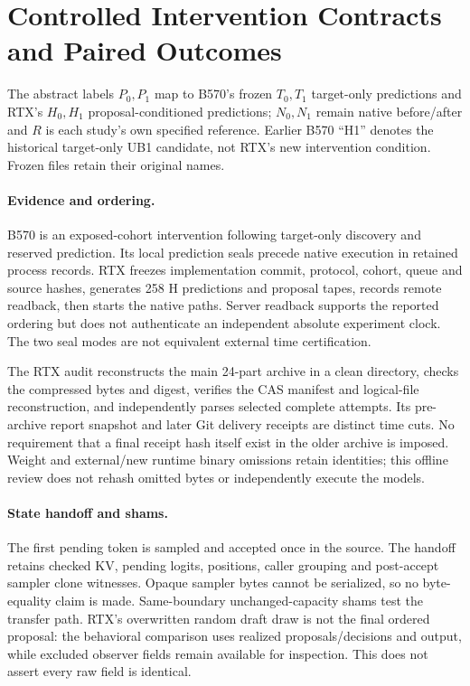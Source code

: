 \section{Controlled Intervention Contracts and Paired Outcomes}
\label{app:interventions}
The abstract labels $P_0,P_1$ map to B570's frozen $T_0,T_1$ target-only predictions and RTX's $H_0,H_1$ proposal-conditioned predictions; $N_0,N_1$ remain native before/after and $R$ is each study's own specified reference. Earlier B570 ``H1'' denotes the historical target-only UB1 candidate, not RTX's new intervention condition. Frozen files retain their original names.


\paragraph{Evidence and ordering.}
B570 is an exposed-cohort intervention following target-only discovery and reserved prediction. Its local prediction seals precede native execution in retained process records. RTX freezes implementation commit, protocol, cohort, queue and source hashes, generates 258 H predictions and proposal tapes, records remote readback, then starts the native paths. Server readback supports the reported ordering but does not authenticate an independent absolute experiment clock. The two seal modes are not equivalent external time certification.

The RTX audit reconstructs the main 24-part archive in a clean directory, checks the compressed bytes and digest, verifies the CAS manifest and logical-file reconstruction, and independently parses selected complete attempts. Its pre-archive report snapshot and later Git delivery receipts are distinct time cuts. No requirement that a final receipt hash itself exist in the older archive is imposed. Weight and external/new runtime binary omissions retain identities; this offline review does not rehash omitted bytes or independently execute the models.

\paragraph{State handoff and shams.}
The first pending token is sampled and accepted once in the source. The handoff retains checked KV, pending logits, positions, caller grouping and post-accept sampler clone witnesses. Opaque sampler bytes cannot be serialized, so no byte-equality claim is made. Same-boundary unchanged-capacity shams test the transfer path. RTX's overwritten random draft draw is not the final ordered proposal: the behavioral comparison uses realized proposals/decisions and output, while excluded observer fields remain available for inspection. This does not assert every raw field is identical.

